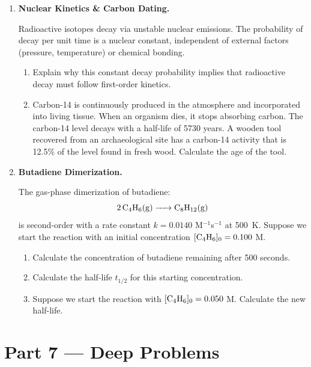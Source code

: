 \documentclass[12pt, a4paper]{book}
\begin{document}
\begin{problembox}
\begin{enumerate}[label=\textbf{P\arabic*.}]
  \item \textbf{Nuclear Kinetics & Carbon Dating.}
  
        Radioactive isotopes decay via unstable nuclear emissions. The probability of decay per unit time is a nuclear constant, independent of external factors (pressure, temperature) or chemical bonding.
        \begin{enumerate}[label=(\alph*)]
          \item Explain why this constant decay probability implies that radioactive decay must follow first-order kinetics.
          \item Carbon-14 is continuously produced in the atmosphere and incorporated into living tissue. When an organism dies, it stops absorbing carbon. The carbon-14 level decays with a half-life of 5730 years.
                A wooden tool recovered from an archaeological site has a carbon-14 activity that is 12.5\% of the level found in fresh wood. Calculate the age of the tool.
        \end{enumerate}

  \item \textbf{Butadiene Dimerization.}
  
        The gas-phase dimerization of butadiene:
        \[
          \ce{2 C4H6(g) -> C8H12(g)}
        \]
        is second-order with a rate constant $k = 0.0140$ M$^{-1}$s$^{-1}$ at \SI{500}{K}.
        Suppose we start the reaction with an initial concentration $[\ce{C4H6}]_0 = 0.100$ M.
        \begin{enumerate}[label=(\alph*)]
          \item Calculate the concentration of butadiene remaining after 500 seconds.
          \item Calculate the half-life $t_{1/2}$ for this starting concentration.
          \item Suppose we start the reaction with $[\ce{C4H6}]_0 = 0.050$ M. Calculate the new half-life.
        \end{enumerate}
\end{enumerate}
\end{problembox}

\newpage

\section{Part 7 --- Deep Problems}
\end{document}
